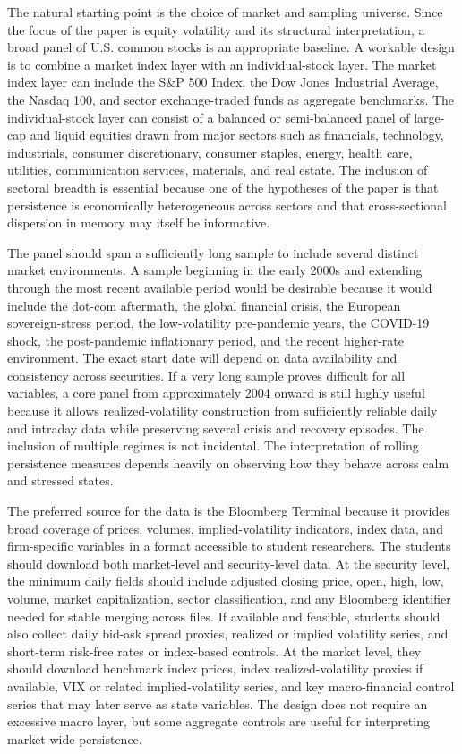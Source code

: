 \documentclass[12pt]{article}
\begin{document}
The natural starting point is the choice of market and sampling universe. Since the focus of the paper is equity volatility and its structural interpretation, a broad panel of U.S. common stocks is an appropriate baseline. A workable design is to combine a market index layer with an individual-stock layer. The market index layer can include the S&P 500 Index, the Dow Jones Industrial Average, the Nasdaq 100, and sector exchange-traded funds as aggregate benchmarks. The individual-stock layer can consist of a balanced or semi-balanced panel of large-cap and liquid equities drawn from major sectors such as financials, technology, industrials, consumer discretionary, consumer staples, energy, health care, utilities, communication services, materials, and real estate. The inclusion of sectoral breadth is essential because one of the hypotheses of the paper is that persistence is economically heterogeneous across sectors and that cross-sectional dispersion in memory may itself be informative.

The panel should span a sufficiently long sample to include several distinct market environments. A sample beginning in the early 2000s and extending through the most recent available period would be desirable because it would include the dot-com aftermath, the global financial crisis, the European sovereign-stress period, the low-volatility pre-pandemic years, the COVID-19 shock, the post-pandemic inflationary period, and the recent higher-rate environment. The exact start date will depend on data availability and consistency across securities. If a very long sample proves difficult for all variables, a core panel from approximately 2004 onward is still highly useful because it allows realized-volatility construction from sufficiently reliable daily and intraday data while preserving several crisis and recovery episodes. The inclusion of multiple regimes is not incidental. The interpretation of rolling persistence measures depends heavily on observing how they behave across calm and stressed states.

The preferred source for the data is the Bloomberg Terminal because it provides broad coverage of prices, volumes, implied-volatility indicators, index data, and firm-specific variables in a format accessible to student researchers. The students should download both market-level and security-level data. At the security level, the minimum daily fields should include adjusted closing price, open, high, low, volume, market capitalization, sector classification, and any Bloomberg identifier needed for stable merging across files. If available and feasible, students should also collect daily bid-ask spread proxies, realized or implied volatility series, and short-term risk-free rates or index-based controls. At the market level, they should download benchmark index prices, index realized-volatility proxies if available, VIX or related implied-volatility series, and key macro-financial control series that may later serve as state variables. The design does not require an excessive macro layer, but some aggregate controls are useful for interpreting market-wide persistence.
\end{document}
